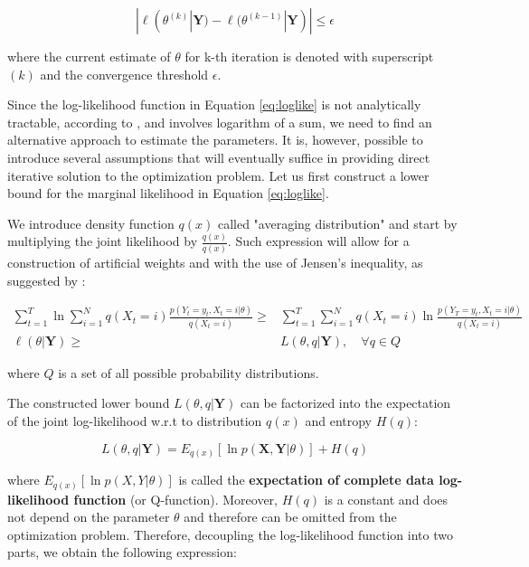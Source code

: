 \begin{equation} \label{eq:conv}
|\ell(\theta^{(k)}|\textbf{Y}) - \ell(\theta^{(k-1)}|\textbf{Y})| \leq \epsilon 
\end{equation}

where the current estimate of $\theta$ for k-th iteration is denoted with superscript $(k)$ 
and the convergence threshold $\epsilon$. 

Since the log-likelihood function in Equation \ref{eq:loglike} is not analytically tractable, according to \citep{Bishop2006}, and involves logarithm of a sum,
we need to find an alternative approach to estimate the parameters.
It is, however, possible to introduce several assumptions that will eventually suffice in providing 
direct iterative solution to the optimization problem. Let us first construct a lower bound for the 
marginal likelihood in Equation \ref{eq:loglike}.

We introduce density function $q(x)$ called "averaging distribution" and start by multiplying 
the joint likelihood by $\frac{q(x)}{q(x)}$. Such expression will allow for a construction of 
artificial weights and with the use of Jensen's inequality, as suggested by \citep{Gu2008}:

\begin{align}
    \sum_{t=1}^{T} \ln \sum_{i=1}^{N} q(X_t = i) \frac{p(Y_t=y_t, X_t = i|\theta)}{q(X_t = i)} \geq& \sum_{t=1}^{T} \sum_{i=1}^{N} q(X_t = i) \ln \frac{p(Y_T =y_t, X_t = i|\theta)}{q(X_t = i)} \\
    \ell(\theta|\textbf{Y}) \geq& L(\theta,q|\textbf{Y}), \quad \forall q \in Q
\end{align}

where $Q$ is a set of all possible probability distributions.

The constructed lower bound $L(\theta,q|\textbf{Y})$ can be factorized into the expectation 
of the joint log-likelihood w.r.t to distribution $q(x)$ and entropy $H(q)$:

\begin{equation}
    L(\theta,q|\textbf{Y}) = E_{q(x)} [\ln p(\textbf{X},\textbf{Y}|\theta)] + H(q)
\end{equation}

where $E_{q(x)} [\ln p(X,Y|\theta)]$ is called the \textbf{expectation of complete data log-likelihood function} (or Q-function).
Moreover, $H(q)$ is a constant and does not depend on the parameter $\theta$ and therefore can be omitted from the
optimization problem. Therefore, decoupling the log-likelihood function into two parts, we obtain the following expression:

